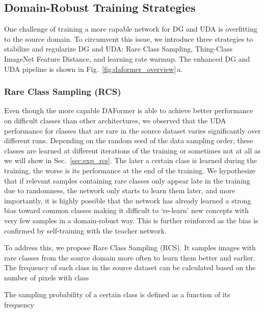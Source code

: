 \documentclass[journal,compsoc]{IEEEtran}
\begin{document}
\subsection{Domain-Robust Training Strategies}
\label{sec:methods_training_strategies}

One challenge of training a more capable network for DG and UDA is overfitting to the source domain. To circumvent this issue, we introduce three strategies to stabilize and regularize DG and UDA: Rare Class Sampling, Thing-Class ImageNet Feature Distance, and learning rate warmup. The enhanced DG and UDA pipeline is shown in Fig.~\ref{fig:daformer_overview}\,a.

\subsubsection{Rare Class Sampling (RCS)}
\label{sec:methods_rare_class_sampling}

Even though the more capable DAFormer is able to achieve better performance on difficult classes than other architectures,
we observed that the UDA performance for classes that are rare in the source dataset varies significantly over different runs.
Depending on the random seed of the data sampling order, these classes are learned at different iterations of the training or sometimes not at all as we will show in Sec.~\ref{sec:exp_rcs}.
The later a certain class is learned during the training, the worse is its performance at the end of the training. 
We hypothesize that if relevant samples containing rare classes only appear late in the training due to randomness, the network only starts to learn them later, and more importantly, it is highly possible that the network has already learned a strong bias toward common classes making it difficult to `re-learn' new concepts with very few samples in a domain-robust way. This is further reinforced as the bias is confirmed by self-training with the teacher network.

To address this, we propose Rare Class Sampling (RCS). It samples images with rare classes from the source domain more often to learn them 
better and earlier.
The frequency  of each class  in the source dataset can be calculated based on the number of pixels with class 

The sampling probability  of a certain class  is defined as a function of its frequency 
\end{document}
